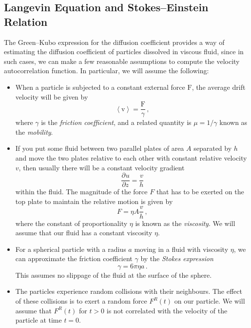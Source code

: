 \documentclass{article}
\theoremstyle{plain}\theoremheaderfont{\normalfont\bfseries}\theorembodyfont{\rmfamily}\theoremseparator{.}\newtheorem*{thm}{Theorem}\newtheorem*{law}{Law}\newtheorem*{pos}{Postulate}
\numberwithin{equation}{section}
\newcommand{\pdv}[3][]{\frac{\partial^{#1} #2}{{\partial #3}^{#1}}}
\newcommand{\eval}[1]{\left\langle #1 \right\rangle}
\newcommand{\vb}[1]{\bm{\mathrm{#1}}}
\begin{document}
    \subsection{Langevin Equation and Stokes--Einstein Relation}
    The Green--Kubo expression for the diffusion coefficient provides a way of estimating the diffusion coefficient of particles dissolved in viscous fluid, since in such cases, we can make a few reasonable assumptions to compute the velocity autocorrelation function. In particular, we will assume the following:
    \begin{itemize}
        \item When a particle is subjected to a constant external force \(\vb{F}\), the average drift velocity will be given by
        \begin{equation}
            \eval{\vb{v}}=\frac{\vb{F}}{\gamma}\,,
        \end{equation}
        where \(\gamma\) is the \textit{friction coefficient}, and a related quantity is \(\mu=1/\gamma\) known as the \textit{mobility}.
        \item If you put some fluid between two parallel plates of area \(A\) separated by \(h\) and move the two plates relative to each other with constant relative velocity \(v\), then usually there will be a constant velocity gradient
        \begin{equation}
            \pdv{u}{z}=\frac{v}{h}
        \end{equation}
        within the fluid. The magnitude of the force \(F\) that has to be exerted on the top plate to maintain the relative motion is given by
        \begin{equation}
            F=\eta A\frac{v}{h}\,,
        \end{equation}
        where the constant of proportionality \(\eta\) is known as the \textit{viscosity}. We will assume that our fluid has a constant viscosity \(\eta\).
        \item For a spherical particle with a radius \(a\) moving in a fluid with viscosity \(\eta\), we can approximate the friction coefficient \(\gamma\) by the \textit{Stokes expression}
        \begin{equation}
            \gamma=6\pi\eta a\,.
        \end{equation}
        This assumes no slippage of the fluid at the surface of the sphere.
        \item The particles experience random collisions with their neighbours. The effect of these collisions is to exert a random force \(F^R(t)\) on our particle. We will assume that \(F^R(t)\) for \(t>0\) is not correlated with the velocity of the particle at time \(t=0\).
    \end{itemize}
\end{document}
